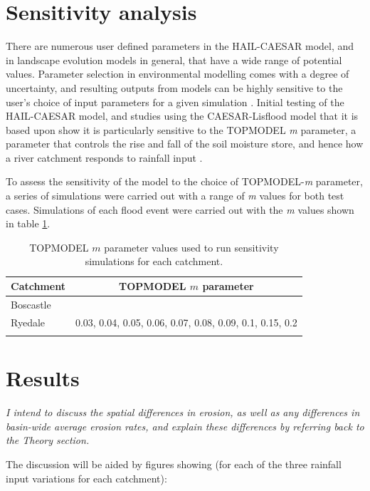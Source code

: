\section{Sensitivity analysis}
There are numerous user defined parameters in the HAIL-CAESAR model, and in landscape evolution models in general, that have a wide range of potential values. Parameter selection in environmental modelling comes with a degree of uncertainty, and resulting outputs from models can be highly sensitive to the user's choice of input parameters for a given simulation \citep{Pelletier2012}. Initial testing of the HAIL-CAESAR model, and studies using the CAESAR-Lisflood model that it is based upon show it is particularly sensitive to the TOPMODEL \textit{m} parameter, a parameter that controls the rise and fall of the soil moisture store, and hence how a river catchment responds to rainfall input \citep{beven1979physically}. 

To assess the sensitivity of the model to the choice of TOPMODEL-\textit{m} parameter, a series of simulations were carried out with a range of \textit{m} values for both test cases. Simulations of each flood event were carried out with the \textit{m} values shown in table \ref{table-m-sens}.

\begin{table}
\begin{tabular}{lc}
\textbf{Catchment} & \textbf{TOPMODEL \(m\) parameter} \\
\hline
Boscastle  &                                            \\
Ryedale     & 0.03, 0.04, 0.05, 0.06, 0.07, 0.08, 0.09, 0.1, 0.15, 0.2  \\
\hline
\\ 
\end{tabular}
\caption{TOPMODEL \(m\) parameter values used to run sensitivity simulations for each catchment.}
\label{table-m-sens}
\end{table}

\section{Results}
\textit{I intend to discuss the spatial differences in erosion, as well as any differences in basin-wide average erosion rates, and explain these differences by referring back to the Theory section.}

The discussion will be aided by figures showing (for each of the three rainfall input variations for each catchment):

